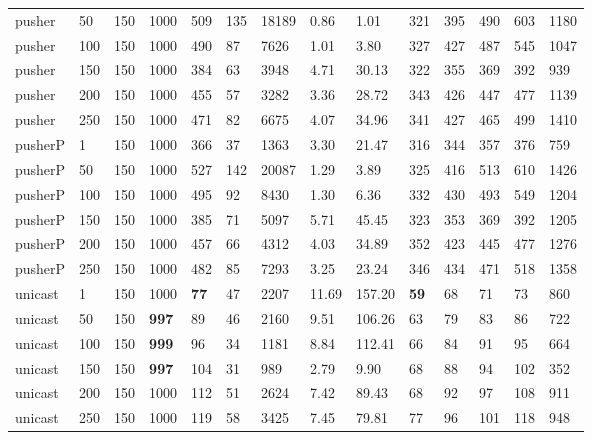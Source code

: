 \begin{table}[!htb]
\begin{tabular}{llllllllllllll}
pusher     & 50           & 150   & 1000 & 509  & 135  & 18189    & 0.86     & 1.01     & 321 & 395  & 490  & 603  & 1180  \\
pusher     & 100          & 150   & 1000 & 490  & 87   & 7626     & 1.01     & 3.80     & 327 & 427  & 487  & 545  & 1047  \\
pusher     & 150          & 150   & 1000 & 384  & 63   & 3948     & 4.71     & 30.13    & 322 & 355  & 369  & 392  & 939   \\
pusher     & 200          & 150   & 1000 & 455  & 57   & 3282     & 3.36     & 28.72    & 343 & 426  & 447  & 477  & 1139  \\
pusher     & 250          & 150   & 1000 & 471  & 82   & 6675     & 4.07     & 34.96    & 341 & 427  & 465  & 499  & 1410  \\ \hline
pusherP & 1            & 150   & 1000 & 366  & 37   & 1363     & 3.30     & 21.47    & 316 & 344  & 357  & 376  & 759   \\
pusherP & 50           & 150   & 1000 & 527  & 142  & 20087    & 1.29     & 3.89     & 325 & 416  & 513  & 610  & 1426  \\
pusherP & 100          & 150   & 1000 & 495  & 92   & 8430     & 1.30     & 6.36     & 332 & 430  & 493  & 549  & 1204  \\
pusherP & 150          & 150   & 1000 & 385  & 71   & 5097     & 5.71     & 45.45    & 323 & 353  & 369  & 392  & 1205  \\
pusherP & 200          & 150   & 1000 & 457  & 66   & 4312     & 4.03     & 34.89    & 352 & 423  & 445  & 477  & 1276  \\
pusherP & 250          & 150   & 1000 & 482  & 85   & 7293     & 3.25     & 23.24    & 346 & 434  & 471  & 518  & 1358  \\ \hline
unicast & 1            & 150   & 1000 & \textbf{77}   & 47   & 2207     & 11.69    & 157.20   & \textbf{59}  & 68   & 71   & 73   & 860   \\
unicast & 50           & 150   & \textbf{997}  & 89   & 46   & 2160     & 9.51     & 106.26   & 63  & 79   & 83   & 86   & 722   \\
unicast & 100          & 150   & \textbf{999}  & 96   & 34   & 1181     & 8.84     & 112.41   & 66  & 84   & 91   & 95   & 664   \\
unicast & 150          & 150   & \textbf{997}  & 104  & 31   & 989      & 2.79     & 9.90     & 68  & 88   & 94   & 102  & 352   \\
unicast & 200          & 150   & 1000 & 112  & 51   & 2624     & 7.42     & 89.43    & 68  & 92   & 97   & 108  & 911   \\
unicast & 250          & 150   & 1000 & 119  & 58   & 3425     & 7.45     & 79.81    & 77  & 96   & 101  & 118  & 948  \\ \bottomrule
\end{tabular}
\end{table}



